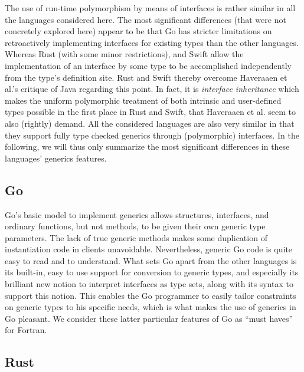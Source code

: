 \documentclass[11pt,oneside]{report}
\begin{document}
The use of run-time polymorphism by means of interfaces is rather
similar in all the languages considered here. The most significant
differences (that were not concretely explored here) appear to be that
Go has stricter limitations on retroactively implementing interfaces
for existing types than the other languages. Whereas Rust (with some
minor restrictions), and Swift allow the implementation of an
interface by some type to be accomplished independently from the
type's definition site. Rust and Swift thereby overcome Haveraaen et
al.'s critique \cite{Haveraaen_et_al_19} of Java regarding this
point. In fact, it is \emph{interface inheritance} which makes the
uniform polymorphic treatment of both intrinsic and user-defined types
possible in the first place in Rust and Swift, that Haveraaen et
al. seem to also (rightly) demand. All the considered languages are
also very similar in that they support fully type checked generics
through (polymorphic) interfaces. In the following, we will thus only
summarize the most significant differences in these languages'
generics features.

\subsection{Go}

Go's basic model to implement generics allows structures, interfaces,
and ordinary functions, but not methods, to be given their own generic
type parameters. The lack of true generic methods makes some
duplication of instantiation code in clients
unavoidable. Nevertheless, generic Go code is quite easy to read and
to understand. What sets Go apart from the other languages is its
built-in, easy to use support for conversion to generic types, and
especially its brilliant new notion to interpret interfaces as type
sets, along with its syntax to support this notion. This enables the
Go programmer to easily tailor constraints on generic types to his
specific needs, which is what makes the use of generics in Go
pleasant. We consider these latter particular features of Go as ``must
haves'' for Fortran.

\subsection{Rust}
\end{document}
